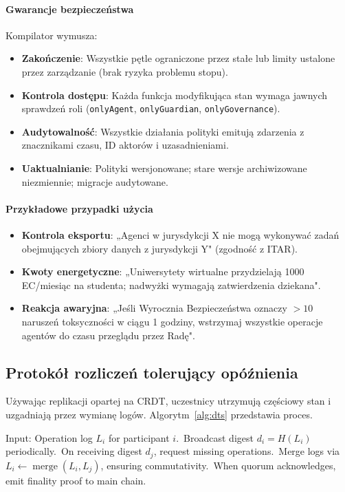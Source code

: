 \documentclass[11pt]{article}
\begin{document}
\paragraph{Gwarancje bezpieczeństwa} Kompilator wymusza:
\begin{itemize}[noitemsep]
  \item \textbf{Zakończenie}: Wszystkie pętle ograniczone przez stałe lub limity ustalone przez zarządzanie (brak ryzyka problemu stopu).
  \item \textbf{Kontrola dostępu}: Każda funkcja modyfikująca stan wymaga jawnych sprawdzeń roli (\texttt{onlyAgent}, \texttt{onlyGuardian}, \texttt{onlyGovernance}).
  \item \textbf{Audytowalność}: Wszystkie działania polityki emitują zdarzenia z znacznikami czasu, ID aktorów i uzasadnieniami.
  \item \textbf{Uaktualnianie}: Polityki wersjonowane; stare wersje archiwizowane niezmiennie; migracje audytowane.
\end{itemize}

\paragraph{Przykładowe przypadki użycia}
\begin{itemize}[noitemsep]
  \item \textbf{Kontrola eksportu}: „Agenci w jurysdykcji X nie mogą wykonywać zadań obejmujących zbiory danych z jurysdykcji Y" (zgodność z ITAR).
  \item \textbf{Kwoty energetyczne}: „Uniwersytety wirtualne przydzielają 1000 EC/miesiąc na studenta; nadwyżki wymagają zatwierdzenia dziekana".
  \item \textbf{Reakcja awaryjna}: „Jeśli Wyrocznia Bezpieczeństwa oznaczy $>10$ naruszeń toksyczności w ciągu 1 godziny, wstrzymaj wszystkie operacje agentów do czasu przeglądu przez Radę".
\end{itemize}

\subsection{Protokół rozliczeń tolerujący opóźnienia}
Używając replikacji opartej na CRDT, uczestnicy utrzymują częściowy stan i uzgadniają przez wymianę logów. Algorytm~\ref{alg:dts} przedstawia proces.

\begin{algorithm}[H]
  \caption{Delay-Tolerant Settlement (DTS)}
  \label{alg:dts}
  \begin{algorithmic}[1]
    \STATE Input: Operation log $L_i$ for participant $i$.\
    \STATE Broadcast digest $d_i = H(L_i)$ periodically.\
    \STATE On receiving digest $d_j$, request missing operations.\
    \STATE Merge logs via $L_i \leftarrow \operatorname{merge}(L_i, L_j)$, ensuring commutativity.\
    \STATE When quorum acknowledges, emit finality proof to main chain.\
  \end{algorithmic}
\end{algorithm}
\end{document}
